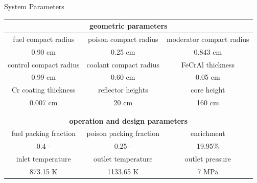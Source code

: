 \documentclass[9pt,t,aspectratio=169]{beamer}
\begin{document}
\begin{frame}{System Parameters}
    \begin{table}[h]
        \centering
        \begin{tabular}{|c|c|c|}
            \hline
            \multicolumn{3}{|c|}{\textbf{geometric parameters}} \\
            \hline
            fuel compact radius & poison compact radius & moderator compact radius  \\
            0.90 cm & 0.25 cm   & 0.843 cm  \\
            \hline
            control compact radius & coolant compact radius & FeCrAl thickness \\
            0.99 cm    & 0.60 cm & 0.05 cm \\
            \hline
            Cr coating thickness & reflector heights & core height \\
            \hline
            0.007 cm & 20 cm & 160 cm \\
            \hline
        \multicolumn{3}{c}{} \\
        \multicolumn{3}{c}{} \\
        \hline
        \multicolumn{3}{|c|}{\textbf{operation and design parameters}} \\
        \hline
        fuel packing fraction & poison packing fraction  & enrichment \\
        \hline
        0.4 -  & 0.25 - &  19.95\% \\
        \hline
        inlet temperature & outlet temperature & outlet pressure \\
        \hline
        873.15 K & 1133.65 K  & 7 MPa \\
        \hline
        \end{tabular}
        \label{tab:operational_params}
    \end{table}
\end{frame}
\end{document}
